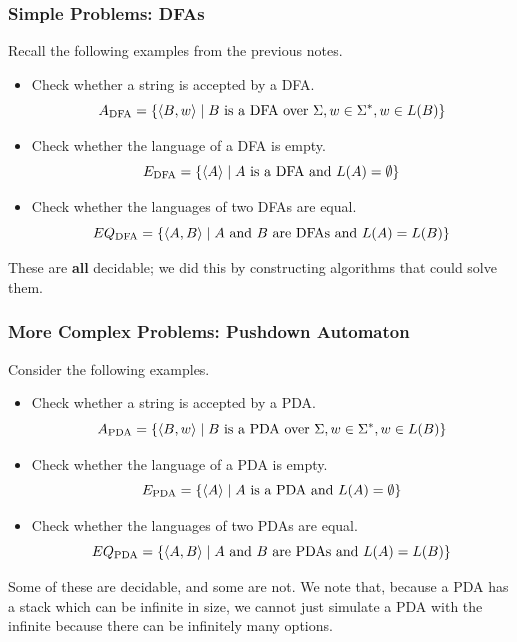 \documentclass[letterpaper]{article}
\begin{document}
\subsubsection{Simple Problems: DFAs}
Recall the following examples from the previous notes. 
\begin{itemize}
    \item Check whether a string is accepted by a DFA. 
    \[A_{\text{DFA}} = \{\langle B, w \rangle \mid B \text{ is a DFA over } \Sigma, w \in \Sigma^*, w \in L(B)\}\]

    \item Check whether the language of a DFA is empty. 
    \[E_{\text{DFA}} = \{\langle A \rangle \mid A \text{ is a DFA and } L(A) = \emptyset\}\]
    
    \item Check whether the languages of two DFAs are equal.
    \[EQ_{\text{DFA}} = \{\langle A, B \rangle \mid A \text{ and } B \text{ are DFAs and } L(A) = L(B)\}\]
\end{itemize}
These are \textbf{all} decidable; we did this by constructing algorithms that could solve them. 

\subsubsection{More Complex Problems: Pushdown Automaton}
Consider the following examples.
\begin{itemize}
    \item Check whether a string is accepted by a PDA. 
    \[A_{\text{PDA}} = \{\langle B, w \rangle \mid B \text{ is a PDA over } \Sigma, w \in \Sigma^*, w \in L(B)\}\]

    \item Check whether the language of a PDA is empty. 
    \[E_{\text{PDA}} = \{\langle A \rangle \mid A \text{ is a PDA and } L(A) = \emptyset\}\]
    
    \item Check whether the languages of two PDAs are equal.
    \[EQ_{\text{PDA}} = \{\langle A, B \rangle \mid A \text{ and } B \text{ are PDAs and } L(A) = L(B)\}\]
\end{itemize}
Some of these are decidable, and some are not. We note that, because a PDA has a stack which can be infinite in size, we cannot just simulate a PDA with the infinite because there can be infinitely many options. 
\end{document}
